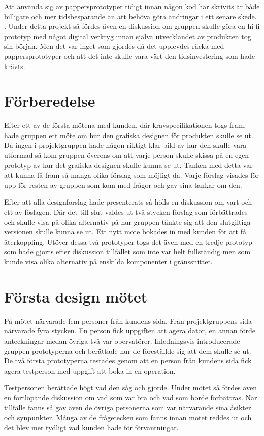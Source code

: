 Att använda sig av pappersprototyper tidigt innan någon kod har skrivits är både billigare och mer tidsbesparande än att behöva göra ändringar i ett senare skede. \cite{paper}. Under detta projekt så fördes även en diskussion om gruppen skulle göra en hi-fi prototyp med något digital verktyg innan själva utvecklandet av produkten tog sin början. Men det var inget som gjordes då det upplevdes räcka med pappersprototyper och att det inte skulle vara värt den tidsinvestering som hade krävts.      

\section{Förberedelse}
Efter ett av de första mötena med kunden, där kravspecifikationen togs fram, hade gruppen ett möte om hur den grafiska designen för produkten  skulle se ut. Då ingen i projektgruppen hade någon riktigt klar bild av hur den skulle vara utformad så kom gruppen överens om att varje person skulle skissa på en egen prototyp av hur det grafiska designen skulle kunna se ut. Tanken med detta var att kunna få fram så många olika förslag som möjligt då. Varje förslag visades för upp för resten av gruppen som kom med frågor och gav sina tankar om den.

Efter att alla designförslag hade presenterats så hölls en diskussion om vart och ett av föslagen. Där det till slut valdes ut två stycken förslag som förbättrades och skulle visa på olika alternativ på hur gruppen tänkte sig att den slutgiltiga versionen skulle kunna se ut. Ett nytt möte bokades in med kunden för att få återkoppling. Utöver dessa två prototyper togs det även med en tredje prototyp som hade gjorts efter diskussion tillfället som inte var helt fullständig men som kunde visa olika alternativ på enskilda komponenter i gränssnittet.

\section{Första design mötet}
På mötet närvarade fem personer från kundens sida. Från projektgruppens sida närvarade fyra stycken. En person fick uppgiften att agera dator, en annan förde anteckningar medan övriga två var obervatörer. Inledningsvis introducerade gruppen prototyperna och berättade hur de föreställde sig att dem skulle se ut. De två första prototyperna testades genom att en person från kundens sida fick agera testperson med uppgift att boka in en operation.

Testpersonen berättade högt vad den såg och gjorde. Under mötet så fördes även en fortlöpande diskussion om vad som var bra och vad som borde förbättras. När tillfälle fanns så gav även de övriga personerna som var närvarande sina åsikter och synpunkter. Många av de frågetecken som fanns innan mötet reddes ut och det blev mer tydligt vad kunden hade för förväntningar. 

